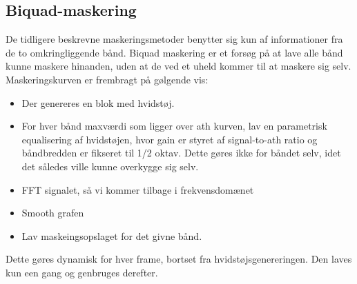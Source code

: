 \subsection*{Biquad-maskering}
De tidligere beskrevne maskeringsmetoder benytter sig kun af
informationer fra de to omkringliggende bånd. Biquad maskering er et
forsøg på at lave alle bånd kunne maskere hinanden, uden at de ved et
uheld kommer til at maskere sig selv.\\
Maskeringskurven er frembragt på gølgende vis:
\begin{itemize}
\item Der genereres en blok med hvidstøj.
\item For hver bånd maxværdi som ligger over ath kurven, lav en parametrisk
  equalisering af hvidstøjen, hvor gain er styret af signal-to-ath
  ratio og båndbredden er fikseret til 1/2 oktav. Dette gøres ikke for
  båndet selv, idet det således ville kunne overkygge sig selv.
\item FFT signalet, så vi kommer tilbage i frekvensdomænet
\item Smooth grafen
\item Lav maskeingsopslaget for det givne bånd.
\end{itemize}
Dette gøres dynamisk for hver frame, bortset fra
hvidstøjsgenereringen. Den laves kun een gang og genbruges derefter.
